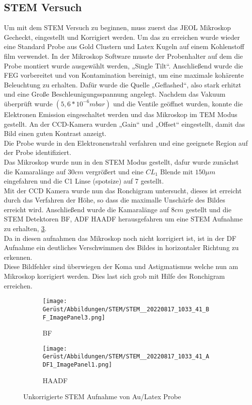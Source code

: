 \subsection{STEM Versuch}
Um mit dem STEM Versuch zu beginnen, muss zuerst das JEOL Mikroskop Gecheckt, eingestellt und Korrigiert werden. Um das zu erreichen wurde wieder eine Standard Probe aus Gold Clustern und Latex Kugeln auf einem Kohlenstoff film verwendet. In der Mikroskop Software musste der Probenhalter auf dem die Probe montiert wurde ausgewählt werden, „Single Tilt“. Anschließend wurde die FEG vorbereitet und von Kontamination bereinigt, um eine maximale kohärente Beleuchtung zu erhalten. Dafür wurde die Quelle „Geflashed“, also stark erhitzt und eine Große Beschleunigungsspannung angelegt. Nachdem das Vakuum überprüft wurde \((5,6*10^{-6} mbar)\) und die Ventile geöffnet wurden, konnte die Elektronen Emission eingeschaltet werden und das Mikroskop im TEM Modus gestellt. An der CCD-Kamera wurden „Gain“ und „Offset“ eingestellt, damit das Bild einen guten Kontrast anzeigt.\\
Die Probe wurde in den Elektronenstrahl verfahren und eine geeignete Region auf der Probe identifiziert.\\
Das Mikroskop wurde nun in den STEM Modus gestellt, dafur wurde zunächst die Kamaralänge auf \(30cm\) vergrößert und eine \(CL_1\) Blende mit \(150\mu m\) eingefahren und die C1 Linse (spotsize) auf 7 gestellt.\\
Mit der CCD Kamera wurde nun das Ronchigram untersucht, dieses ist erreicht durch das Verfahren der Höhe, so dass die maximalle Unschärfe des Bildes erreicht wird. Anschließend wurde die Kamaralänge auf \(8cm\) gestellt und die STEM Detektoren BF, ADF HAADF herausgefahren um eine STEM Aufnahme zu erhalten, \cref{STEMAstigmatismus}.\\
Da in diesen aufnahmen das Mikroskop noch nicht korrigiert ist, ist in der DF Aufnahme ein deutliches Verschwimmen des Bildes in horizontaler
Richtung zu erkennen.\\
Diese Bildfehler sind überwiegen der Koma und Astigmatismus welche nun am Mikroskop korrigiert werden. Dies last sich grob mit Hilfe des Ronchigram erreichen.

\begin{figure}[H]
     \centering
     \begin{subfigure}[b]{0.49\textwidth}
         \centering
         \texttt{[image: Gerüst/Abbildungen/STEM/STEM\_\_20220817\_1033\_41\_BF\_ImagePanel3.png]}
         \caption{BF}
         \label{astigBF}
     \end{subfigure}
     \hfill
     \begin{subfigure}[b]{0.49\textwidth}
         \centering
         \texttt{[image: Gerüst/Abbildungen/STEM/STEM\_\_20220817\_1033\_41\_ADF1\_ImagePanel1.png]}
         \caption{HAADF}
         \label{astigDF}
     \end{subfigure}
        \caption{Unkorrigierte STEM Aufnahme von Au/Latex Probe}
        \label{STEMAstigmatismus}
\end{figure}

